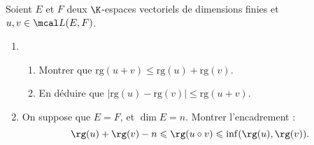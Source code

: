 Soient $E$ et $F$ deux $\K$-espaces vectoriels de dimensions finies et $u, v \in \mcal L (E, F)$.
\begin{enumerate}
\item
\begin{enumerate}
 \item
Montrer que $\text{rg} (u + v) \leqslant \text{rg} (u) + \text{rg} (v)$.
\item En déduire que $\left|\text{rg} (u) - \text{rg} (v)\right| \leqslant
\text{rg} (u + v)$.
\end{enumerate}
\item On suppose que $E=F$, et $\dim E=n$. Montrer l'encadrement :
$$\rg(u)+\rg(v)-n\leqslant \rg(u\circ v)\leqslant \inf (\rg(u),\rg(v)). $$
\end{enumerate}

